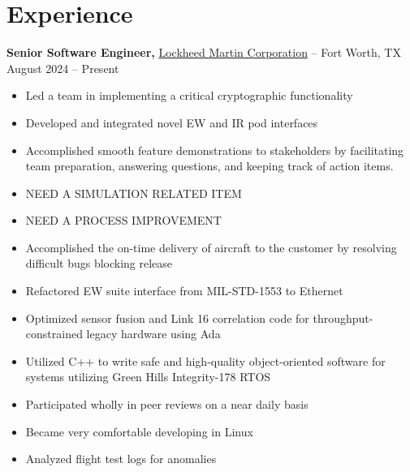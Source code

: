 \documentclass[11pt]{article}       %
\begin{document}
\section*{Experience}
\textbf{Senior Software Engineer,} \href{https://www.lockheedmartin.com/}{Lockheed Martin Corporation} -- Fort Worth, TX \hfill August 2024 -- Present \\
\vspace{-9pt}
\begin{itemize}
  \item Led a team in implementing a critical cryptographic functionality
  \item Developed and integrated novel EW and IR pod interfaces
  \item Accomplished smooth feature demonstrations to stakeholders by facilitating team preparation, answering questions, and keeping track of action items.
  \item NEED A SIMULATION RELATED ITEM
  \item NEED A PROCESS IMPROVEMENT
  \item Accomplished the on-time delivery of aircraft to the customer by resolving difficult bugs blocking release
  \item Refactored EW suite interface from MIL-STD-1553 to Ethernet
  \item Optimized sensor fusion and Link 16 correlation code for throughput-constrained legacy hardware using Ada
  \item Utilized C++ to write safe and high-quality object-oriented software for systems utilizing Green Hills Integrity-178 RTOS
  \item Participated wholly in peer reviews on a near daily basis
  \item Became very comfortable developing in Linux
  \item Analyzed flight test logs for anomalies
\end{itemize}
\end{document}
